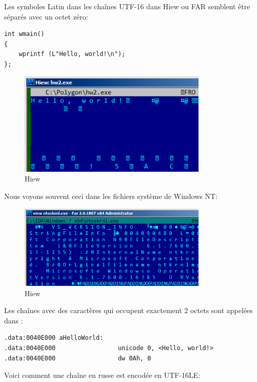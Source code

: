 Les symboles Latin dans les chaînes UTF-16 dans Hiew ou FAR semblent être séparés
avec un octet zéro:

\begin{lstlisting}[style=customc]
int wmain()
{
	wprintf (L"Hello, world!\n");
};
\end{lstlisting}

\begin{figure}[H]
\centering
\includegraphics[width=0.8\textwidth]{digging_into_code/strings/UTF16-string.png}
\caption{Hiew}
\end{figure}

Nous voyons souvent ceci dans les fichiers système de \gls{Windows NT}:

\begin{figure}[H]
\centering
\includegraphics[width=0.8\textwidth]{digging_into_code/strings/ntoskrnl_UTF16.png}
\caption{Hiew}
\end{figure}

Les chaînes avec des caractères qui occupent exactement 2 octets sont appelées 
dans \IDA:

\begin{lstlisting}[style=customasmx86]
.data:0040E000 aHelloWorld:
.data:0040E000                 unicode 0, <Hello, world!>
.data:0040E000                 dw 0Ah, 0
\end{lstlisting}

Voici comment une chaîne en russe est encodée en UTF-16LE:

